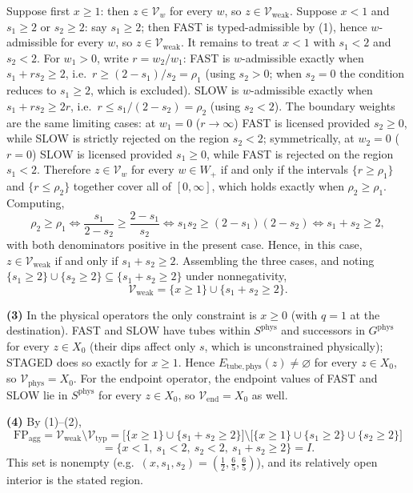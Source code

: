 \documentclass[3p,11pt]{elsarticle}
\begin{document}
Suppose first \(x \ge 1\): then \(z \in \mathcal{V}_w\) for every \(w\),
so \(z \in \mathcal{V}_{\mathrm{weak}}\). Suppose \(x < 1\) and
\(s_1 \ge 2\) or \(s_2 \ge 2\): say \(s_1 \ge 2\); then FAST is
typed-admissible by (1), hence \(w\)-admissible for every \(w\), so
\(z \in \mathcal{V}_{\mathrm{weak}}\). It remains to treat \(x < 1\)
with \(s_1 < 2\) and \(s_2 < 2\). For \(w_1 > 0\), write
\(r = w_2/w_1\): FAST is \(w\)-admissible exactly when
\(s_1 + r s_2 \ge 2\), i.e.~\(r \ge (2 - s_1)/s_2 = \rho_1\) (using
\(s_2 > 0\); when \(s_2 = 0\) the condition reduces to \(s_1 \ge 2\),
which is excluded). SLOW is \(w\)-admissible exactly when
\(s_1 + r s_2 \ge 2r\), i.e.~\(r \le s_1/(2 - s_2) = \rho_2\) (using
\(s_2 < 2\)). The boundary weights are the same limiting cases: at
\(w_1 = 0\) (\(r \to \infty\)) FAST is licensed provided \(s_2 \ge 0\),
while SLOW is strictly rejected on the region \(s_2 < 2\);
symmetrically, at \(w_2 = 0\) (\(r = 0\)) SLOW is licensed provided
\(s_1 \ge 0\), while FAST is rejected on the region \(s_1 < 2\).
Therefore \(z \in \mathcal{V}_w\) for every \(w \in W_+\) if and only if
the intervals \(\{r \ge \rho_1\}\) and \(\{r \le \rho_2\}\) together
cover all of \([0, \infty]\), which holds exactly when
\(\rho_2 \ge \rho_1\). Computing,
\[\rho_2 \ge \rho_1 \iff \frac{s_1}{2 - s_2} \ge \frac{2 - s_1}{s_2} \iff s_1 s_2 \ge (2 - s_1)(2 - s_2) \iff s_1 + s_2 \ge 2,\]
with both denominators positive in the present case. Hence, in this
case, \(z \in \mathcal{V}_{\mathrm{weak}}\) if and only if
\(s_1 + s_2 \ge 2\). Assembling the three cases, and noting
\(\{s_1 \ge 2\} \cup \{s_2 \ge 2\} \subseteq \{s_1 + s_2 \ge 2\}\) under
nonnegativity,
\[\mathcal{V}_{\mathrm{weak}} = \{ x \ge 1 \} \cup \{ s_1 + s_2 \ge 2 \}.\]

\textbf{(3)} In the physical operators the only constraint is
\(x \ge 0\) (with \(q = 1\) at the destination). FAST and SLOW have
tubes within \(S^{\mathrm{phys}}\) and successors in
\(G^{\mathrm{phys}}\) for every \(z \in X_0\) (their dips affect only
\(s\), which is unconstrained physically); STAGED does so exactly for
\(x \ge 1\). Hence \(E_{\mathrm{tube,phys}}(z) \neq \varnothing\) for
every \(z \in X_0\), so \(\mathcal{V}_{\mathrm{phys}} = X_0\). For the
endpoint operator, the endpoint values of FAST and SLOW lie in
\(S^{\mathrm{phys}}\) for every \(z \in X_0\), so
\(\mathcal{V}_{\mathrm{end}} = X_0\) as well.

\textbf{(4)} By (1)--(2),
\[\mathrm{FP}_{\mathrm{agg}} = \mathcal{V}_{\mathrm{weak}} \setminus \mathcal{V}_{\mathrm{typ}}
= \big[ \{x \ge 1\} \cup \{s_1 + s_2 \ge 2\} \big] \setminus \big[ \{x \ge 1\} \cup \{s_1 \ge 2\} \cup \{s_2 \ge 2\} \big]\]
\[= \{ x < 1,\ s_1 < 2,\ s_2 < 2,\ s_1 + s_2 \ge 2 \} = I.\]
This set is nonempty
(e.g.~\((x, s_1, s_2) = (\tfrac12, \tfrac65, \tfrac65)\)), and its
relatively open interior is the stated region.
\end{document}

